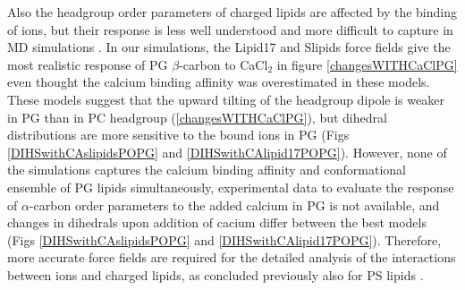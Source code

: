 \documentclass[aps,prl,superscriptaddress,twocolumn]{revtex4}
\begin{document}

Also the headgroup order parameters of charged lipids are affected by the binding of ions,
but their response is less well understood and more difficult to capture in MD simulations \cite{antila19,melcr20}.
In our simulations, the Lipid17 and Slipids force fields give the most realistic response of PG $\beta$-carbon to CaCl$_2$
in figure \ref{changesWITHCaClPG} even thought the calcium binding affinity was overestimated in these models.
These models suggest that the upward tilting of the headgroup dipole is weaker in PG than in PC headgroup (\ref{changesWITHCaClPG}),
but dihedral distributions are more sensitive to the bound ions in PG 
(Figs \ref{DIHSwithCAslipidsPOPG} and \ref{DIHSwithCAlipid17POPG}).
However, none of the simulations captures the calcium binding affinity and conformational ensemble of PG lipids
simultaneously, experimental data to evaluate the response of $\alpha$-carbon order parameters to
the added calcium in PG is not available, and changes in dihedrals upon addition of cacium differ between
the best models (Figs \ref{DIHSwithCAslipidsPOPG} and \ref{DIHSwithCAlipid17POPG}).
Therefore, more accurate force fields are required for the detailed analysis of the interactions between ions
and charged lipids, as concluded previously also for PS lipids \cite{antila19,melcr20}.
\end{document}
